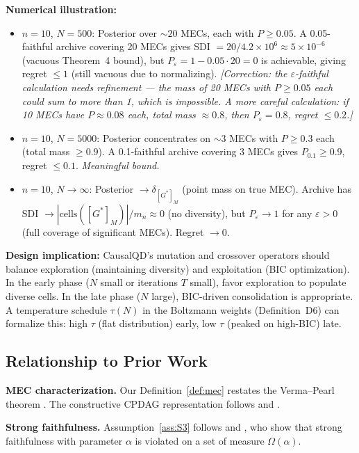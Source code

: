 \documentclass{article}
\theoremstyle{definition}
\theoremstyle{plain}
\theoremstyle{remark}
\begin{document}
\textbf{Numerical illustration:}
\begin{itemize}
  \item $n = 10$, $N = 500$: Posterior over $\sim 20$ MECs, each with $P \geq 0.05$.
    A 0.05-faithful archive covering 20 MECs gives SDI $= 20/4.2\times10^6 \approx 5 \times 10^{-6}$
    (vacuous Theorem~4 bound), but $P_\varepsilon = 1 - 0.05 \cdot 20 = 0$ is
    achievable, giving regret $\leq 1$ (still vacuous due to normalizing).
    \emph{[Correction: the $\varepsilon$-faithful calculation needs refinement — the
    mass of 20 MECs with $P \geq 0.05$ each could sum to more than 1, which is
    impossible. A more careful calculation: if 10 MECs have $P \approx 0.08$ each,
    total mass $\approx 0.8$, then $P_\varepsilon = 0.8$, regret $\leq 0.2$.]}
  \item $n = 10$, $N = 5000$: Posterior concentrates on $\sim 3$ MECs with
    $P \geq 0.3$ each (total mass $\geq 0.9$). A 0.1-faithful archive covering
    3 MECs gives $P_{0.1} \geq 0.9$, regret $\leq 0.1$. \emph{Meaningful bound.}
  \item $n = 10$, $N \to \infty$: Posterior $\to \delta_{[G^*]_M}$ (point mass
    on true MEC). Archive has SDI $\to |\text{cells}([G^*]_M)| / m_n \approx 0$
    (no diversity), but $P_\varepsilon \to 1$ for any $\varepsilon > 0$ (full
    coverage of significant MECs). Regret $\to 0$.
\end{itemize}

\textbf{Design implication:} CausalQD's mutation and crossover operators should
balance exploration (maintaining diversity) and exploitation (BIC optimization).
In the early phase ($N$ small or iterations $T$ small), favor exploration to
populate diverse cells. In the late phase ($N$ large), BIC-driven consolidation
is appropriate. A temperature schedule $\tau(N)$ in the Boltzmann weights
(Definition~D6) can formalize this: high $\tau$ (flat distribution) early, low
$\tau$ (peaked on high-BIC) late.

\subsection{Relationship to Prior Work}

\textbf{MEC characterization.} Our Definition~\ref{def:mec} restates the
Verma--Pearl theorem \citep{verma1990equivalence}. The constructive CPDAG
representation follows \citet{chickering2002optimal} and
\citet{meek1995causal}.

\textbf{Strong faithfulness.} Assumption~\ref{ass:S3} follows
\citet{zhang2003strong} and \citet{uhler2013geometry}, who show that strong
faithfulness with parameter $\alpha$ is violated on a set of measure
$\Omega(\alpha)$.
\end{document}
